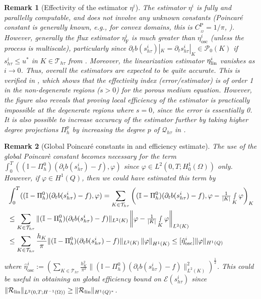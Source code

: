 \documentclass[review,11pt]{article}
\numberwithin{equation}{section}
\def \f  {\varphi}
\def \Om {\Omega}
\def \p  {\partial}
\def \htt {{h\tau}}
\def \calE {\mathcal{E}}
\def \calP {\mathcal{P}}
\def \calQ {\bm{\mathcal{Q}}}
\def \calT {\mathcal{T}}
\newtheorem{remark}[remark]{Remark}
\begin{document}
\begin{remark}[Effectivity of the estimator $\eta^i$] The estimator $\eta^i$ is fully and parallelly computable, and does not involve any unknown constants (Poincar\'e constant is generally known, e.g., for convex domains, this is $C_{\,\!_{\Omega}}^{\mathrm{P}}=1/\pi$, \cite{payne1960optimal}). 
However, generally the flux estimator $\eta_{\mathrm{F}}^i$ is much greater than $\eta_{\mathrm{osc}}^i$ (unless the process is multiscale), particularly since $\p_t b(s^i_\htt)|_K=\p_t s^i_\htt|_K \in \calP_0(K)$ if $s^i_\htt\leq u^*$ in $K\in \calT_\htt$ from . Moreover, the linearization estimator $\eta_{\rm lin}^i$ vanishes as $i\to 0$. Thus, overall the estimators are expected to be quite accurate. This is verified in , which shows that the effectivity index (error/estimator) is of order 1 in the non-degenerate regions ($s>0$) for the porous medium equation. However, the figure also reveals that proving local efficiency of the estimator is practically impossible at the degenerate regions where $s=0$, since the error is essentially 0. It is also possible to increase accuracy of the estimator further by taking higher degree projections $\Pi^p_h$ by increasing the degree $p$ of $\calQ_\htt$ in . 
\end{remark}

\begin{remark}[Global Poincaré constants in  and efficiency estimate]\label{remark:efficiency} The use of the global Poincarè constant becomes necessary for the term $\int_0^T ((\mathbb{I}-\Pi_h^0) (\p_t b(s^i_\htt) - f),\f)$ since $\f\in L^2(0,T;H^1_0(\Om))$ only. However, if $\f\in H^1(Q)$, then we could have estimated this term by 
\begin{align*}
    &\int_0^T ((\mathbb{I}-\Pi_h^0) (\p_t b(s^i_\htt) - f),\f)=\sum_{K\in \calT_\htt} \left((\mathbb{I}-\Pi_h^0) (\p_t b(s^i_\htt) - f),\f-\tfrac{1}{|K|}\smallint_K \f \right)_K\\
    &\leq \sum_{K\in \calT_\htt}\|(\mathbb{I}-\Pi_h^0) (\p_t b(s^i_\htt) - f)\|_{L^2(K)}\left\|\f-\tfrac{1}{|K|}\smallint_K \f\right\|_{L^2(K)}\\
    &\leq \sum_{K\in \calT_\htt} \frac{h_K}{\pi} \|(\mathbb{I}-\Pi_h^0) (\p_t b(s^i_\htt) - f)\|_{L^2(K)}\left\|\f\right\|_{H^1(K)} \leq [\hat{\eta}_{\mathrm{osc}}^i] \|\f\|_{H^1(Q)}
\end{align*}
where $\hat{\eta}_{\mathrm{osc}}^i:=\left(\sum_{K\in \calT_\htt} \frac{h_K^2}{\pi^2}\|(\mathbb{I}-\Pi_h^0) (\p_t b(s^i_\htt) - f)\|_{L^2(K)}^2\right)^{\frac{1}{2}} $.
This could be useful in obtaining an global efficiency bound on $\calE(s^i_\htt)$ since $\|\mathcal{R}_{\rm lin}\|_{L^2(0,T;H^{-1}(\Omega))} \geq \|\mathcal{R}_{\rm lin}\|_{H^1(Q)^*}$.
\end{remark}
\end{document}

